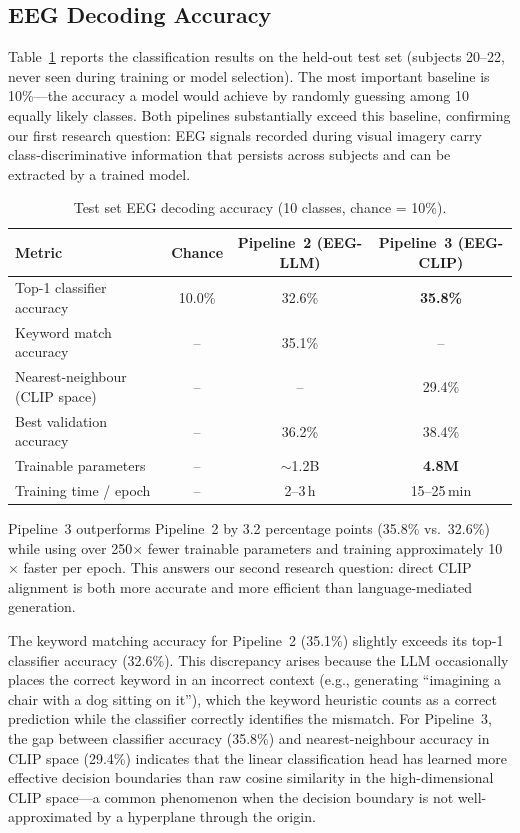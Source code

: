 \documentclass{article}
\begin{document}
\subsection{EEG Decoding Accuracy}

Table~\ref{tab:accuracy} reports the classification results on the held-out test set (subjects 20--22, never seen during training or model selection). The most important baseline is 10\%---the accuracy a model would achieve by randomly guessing among 10 equally likely classes. Both pipelines substantially exceed this baseline, confirming our first research question: EEG signals recorded during visual imagery carry class-discriminative information that persists across subjects and can be extracted by a trained model.

\begin{table}[h]
  \centering
  \caption{Test set EEG decoding accuracy (10 classes, chance = 10\%).}
  \label{tab:accuracy}
  \begin{tabular}{lccc}
    \toprule
    \textbf{Metric} & \textbf{Chance} & \textbf{Pipeline~2 (EEG-LLM)} & \textbf{Pipeline~3 (EEG-CLIP)} \\
    \midrule
    Top-1 classifier accuracy      & 10.0\% & 32.6\%  & \textbf{35.8\%} \\
    Keyword match accuracy         & --     & 35.1\%  & -- \\
    Nearest-neighbour (CLIP space) & --     & --      & 29.4\% \\
    Best validation accuracy       & --     & 36.2\%  & 38.4\% \\
    Trainable parameters           & --     & $\sim$1.2B & \textbf{4.8M} \\
    Training time / epoch          & --     & 2--3\,h & 15--25\,min \\
    \bottomrule
  \end{tabular}
\end{table}

Pipeline~3 outperforms Pipeline~2 by 3.2 percentage points (35.8\% vs.\ 32.6\%) while using over 250$\times$ fewer trainable parameters and training approximately 10$\times$ faster per epoch. This answers our second research question: direct CLIP alignment is both more accurate and more efficient than language-mediated generation.

The keyword matching accuracy for Pipeline~2 (35.1\%) slightly exceeds its top-1 classifier accuracy (32.6\%). This discrepancy arises because the LLM occasionally places the correct keyword in an incorrect context (e.g., generating ``imagining a chair with a dog sitting on it''), which the keyword heuristic counts as a correct prediction while the classifier correctly identifies the mismatch. For Pipeline~3, the gap between classifier accuracy (35.8\%) and nearest-neighbour accuracy in CLIP space (29.4\%) indicates that the linear classification head has learned more effective decision boundaries than raw cosine similarity in the high-dimensional CLIP space---a common phenomenon when the decision boundary is not well-approximated by a hyperplane through the origin.
\end{document}
